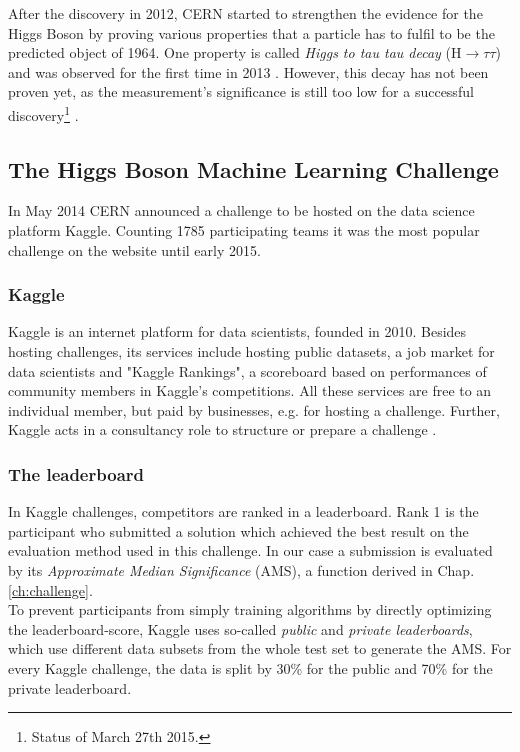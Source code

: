 After the discovery in 2012, CERN started to strengthen the evidence for the Higgs Boson by proving various properties that a particle has to fulfil to be the predicted object of 1964. One property is called \emph{Higgs to tau tau decay} ($\mathrm{H}\rightarrow\tau\tau $) and was observed for the first time in 2013 \cite{atlasNote}. However, this decay has not been proven yet, as the measurement's significance is still too low for a successful discovery\footnote{Status of March 27th 2015.} \cite{howard}.

\subsection{The Higgs Boson Machine Learning Challenge}
In May 2014 CERN announced a challenge to be hosted on the data science platform Kaggle. Counting 1785 participating teams it was the most popular challenge on the website until early 2015.

\subsubsection{Kaggle}
Kaggle is an internet platform for data scientists, founded in 2010. Besides hosting challenges, its services include hosting public datasets, a job market for data scientists and "Kaggle Rankings", a scoreboard based on performances of community members in Kaggle's competitions. All these services are free to an individual member, but paid by businesses, e.g. for hosting a challenge. Further, Kaggle acts in a consultancy role to structure or prepare a challenge \cite{kaggle}.

\subsubsection{The leaderboard}\label{sec:lb}
In Kaggle challenges, competitors are ranked in a leaderboard. Rank 1 is the participant who submitted a solution which achieved the best result on the evaluation method used in this challenge. In our case a submission is evaluated by its \emph{Approximate Median Significance} (AMS), a function derived in Chap. \ref{ch:challenge}.\\
To prevent participants from simply training algorithms by directly optimizing the leaderboard-score, Kaggle uses so-called \emph{public} and \emph{private leaderboards}, which use different data subsets from the whole test set to generate the AMS. For every Kaggle challenge, the data is split by 30\% for the public and 70\% for the private leaderboard.

